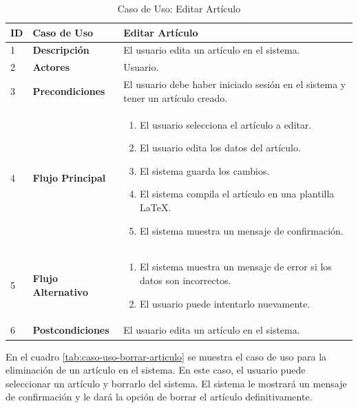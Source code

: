 \begin{table}[H]
    \centering
        \begin{tabular}{|p{0.5cm}|p{3.5cm}|p{10cm}|}
        \hline
        \textbf{ID} & \textbf{Caso de Uso} & \textbf{Editar Artículo} \\
        \hline
        1 & \textbf{Descripción} & El usuario edita un artículo en el sistema. \\
        \hline
        2 & \textbf{Actores} & Usuario. \\
        \hline
        3 & \textbf{Precondiciones} & El usuario debe haber iniciado sesión en el sistema y tener un artículo creado. \\
        \hline
        4 & \textbf{Flujo Principal} & 
        \begin{enumerate}
            \item El usuario selecciona el artículo a editar.
            \item El usuario edita los datos del artículo.
            \item El sistema guarda los cambios.
            \item El sistema compila el artículo en una plantilla LaTeX.
            \item El sistema muestra un mensaje de confirmación.
        \end{enumerate} \\
        \hline
        5 & \textbf{Flujo Alternativo} & 
        \begin{enumerate}
            \item El sistema muestra un mensaje de error si los datos son incorrectos.
            \item El usuario puede intentarlo nuevamente.
        \end{enumerate} \\
        \hline
        6 & \textbf{Postcondiciones} & El usuario edita un artículo en el sistema. \\
        \hline
    \end{tabular}
    \caption{Caso de Uso: Editar Artículo}
    \label{tab:caso-uso-editar-articulo}
\end{table}



En el cuadro \ref{tab:caso-uso-borrar-articulo} se muestra el caso de uso para la eliminación de un artículo en el sistema. En este caso, el usuario puede seleccionar un artículo y borrarlo del sistema. El sistema le mostrará un mensaje de confirmación y le dará la opción de borrar el artículo definitivamente.

